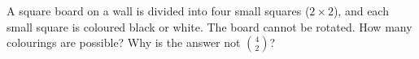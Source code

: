 A square board on a wall is divided into four small squares ($2\times2$), and each small square is coloured black or white. The board cannot be rotated. How many colourings are possible? Why is the answer not $\binom42$?

